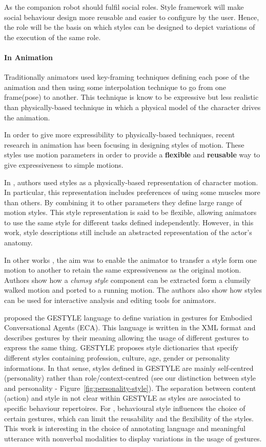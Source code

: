 \documentclass[a4paper,twocolumn]{svjour3}
\begin{document}
As the companion robot should fulfil social roles.
Style framework  will make social behaviour design more reusable and easier to configure by the user. 
Hence, the role will be the basis on which styles can be designed to depict variations of the execution of the same role. 


\paragraph{In Animation}
Traditionally animators used key-framing techniques defining each pose of the animation and then using some interpolation technique to go from one frame(pose) to another. 
This technique is know to be expressive but less realistic than physically-based technique in which a physical model of the character drives the animation.

In order to give more expressibility to physically-based techniques, recent research in animation has been focusing in designing styles of motion. 
These styles use motion parameters in order to provide a \textbf{flexible} and \textbf{reusable} way to give expressiveness to simple motions.

In \cite{Liu2005}, authors used styles as a physically-based representation of character motion. 
In particular, this representation includes preferences of using some muscles more than others.
By combining it to other parameters they define large range of motion styles.
This style representation is said to be flexible, allowing animators to use the same style for different tasks defined independently. However, in this work, style descriptions still include an abstracted representation of the actor's anatomy.

In other works \cite{shapiro2006style}, the aim was to enable the animator to transfer a style form one motion to another to retain the same expressiveness as the original motion.
Authors show how a\textit{ clumsy style} component can be extracted form a clumsily walked motion and ported to a running motion. 
The authors also show how styles can be used for interactive analysis and editing tools for animators.

\cite{Noot2004} proposed the GESTYLE language to define variation in gestures for Embodied Conversational Agents (ECA). 
This language is written in the XML format and describes gestures by their meaning allowing the usage of different gestures to express the same thing.
GESTYLE proposes style dictionaries that specify different styles containing profession, culture, age, gender or personality informations.
In that sense, styles defined in GESTYLE are mainly self-centred (personality) rather than role/context-centred (see our distinction between style and personality - Figure~\ref{fig:personality-style}). 
The separation between content (action) and style in not clear within GESTYLE as styles are associated to specific behaviour repertoires.
For \cite{Noot2004}, behavioural style influences the choice of certain gestures, which can limit the reusability and the flexibility of the styles.
This work is interesting in the choice of annotating language and meaningful utterance with nonverbal modalities to display variations in the usage of gestures.
\end{document}
